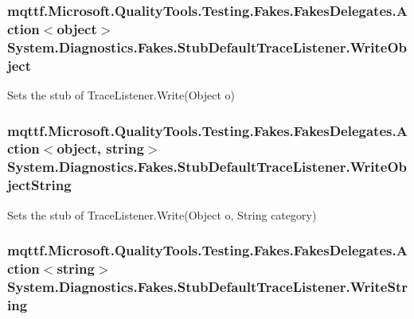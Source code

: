 \hypertarget{class_system_1_1_diagnostics_1_1_fakes_1_1_stub_default_trace_listener_ac0dda9be0d94429b1a5d2890c7f714e5}{
\subsubsection[{Write\-Object}]{\setlength{\rightskip}{0pt plus 5cm}mqttf.\-Microsoft.\-Quality\-Tools.\-Testing.\-Fakes.\-Fakes\-Delegates.\-Action$<$object$>$ System.\-Diagnostics.\-Fakes.\-Stub\-Default\-Trace\-Listener.\-Write\-Object}}\label{class_system_1_1_diagnostics_1_1_fakes_1_1_stub_default_trace_listener_ac0dda9be0d94429b1a5d2890c7f714e5}


Sets the stub of Trace\-Listener.\-Write(\-Object o)

\hypertarget{class_system_1_1_diagnostics_1_1_fakes_1_1_stub_default_trace_listener_a4e1de07c085cd8244759b698ba271fd7}{
\subsubsection[{Write\-Object\-String}]{\setlength{\rightskip}{0pt plus 5cm}mqttf.\-Microsoft.\-Quality\-Tools.\-Testing.\-Fakes.\-Fakes\-Delegates.\-Action$<$object, string$>$ System.\-Diagnostics.\-Fakes.\-Stub\-Default\-Trace\-Listener.\-Write\-Object\-String}}\label{class_system_1_1_diagnostics_1_1_fakes_1_1_stub_default_trace_listener_a4e1de07c085cd8244759b698ba271fd7}


Sets the stub of Trace\-Listener.\-Write(\-Object o, String category)

\hypertarget{class_system_1_1_diagnostics_1_1_fakes_1_1_stub_default_trace_listener_a1859641f827e559b29b2983b29d1408b}{
\subsubsection[{Write\-String}]{\setlength{\rightskip}{0pt plus 5cm}mqttf.\-Microsoft.\-Quality\-Tools.\-Testing.\-Fakes.\-Fakes\-Delegates.\-Action$<$string$>$ System.\-Diagnostics.\-Fakes.\-Stub\-Default\-Trace\-Listener.\-Write\-String}}\label{class_system_1_1_diagnostics_1_1_fakes_1_1_stub_default_trace_listener_a1859641f827e559b29b2983b29d1408b}


